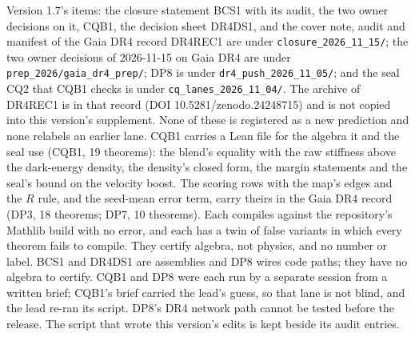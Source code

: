 \documentclass[10pt]{article}
\begin{document}
Version 1.7's items: the closure statement BCS1 with its audit, the two owner decisions on it, CQB1, the decision sheet DR4DS1, and the cover note, audit and manifest of the Gaia DR4 record DR4REC1 are under \texttt{closure\_2026\_11\_15/}; the two owner decisions of 2026-11-15 on Gaia DR4 are under \texttt{prep\_2026/gaia\_dr4\_prep/}; DP8 is under \texttt{dr4\_push\_2026\_11\_05/}; and the seal CQ2 that CQB1 checks is under \texttt{cq\_lanes\_2026\_11\_04/}. The archive of DR4REC1 is in that record (DOI 10.5281/zenodo.24248715) and is not copied into this version's supplement. None of these is registered as a new prediction and none relabels an earlier lane. CQB1 carries a Lean file for the algebra it and the seal use (CQB1, 19 theorems): the blend's equality with the raw stiffness above the dark-energy density, the density's closed form, the margin statements and the seal's bound on the velocity boost. The scoring rows with the map's edges and the $R$ rule, and the seed-mean error term, carry theirs in the Gaia DR4 record (DP3, 18 theorems; DP7, 10 theorems). Each compiles against the repository's Mathlib build with no error, and each has a twin of false variants in which every theorem fails to compile. They certify algebra, not physics, and no number or label. BCS1 and DR4DS1 are assemblies and DP8 wires code paths; they have no algebra to certify. CQB1 and DP8 were each run by a separate session from a written brief; CQB1's brief carried the lead's guess, so that lane is not blind, and the lead re-ran its script. DP8's DR4 network path cannot be tested before the release. The script that wrote this version's edits is kept beside its audit entries.
\end{document}
